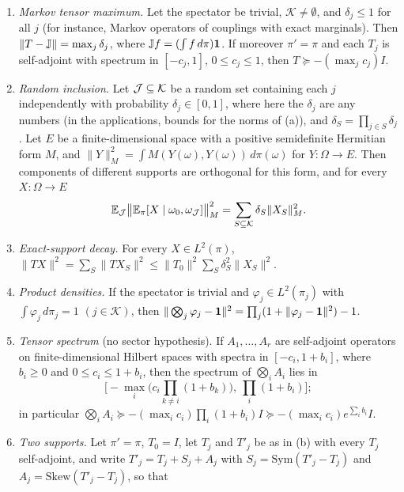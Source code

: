 \begin{lemma}
\begin{enumerate}[label=(\alph*)]
 $\delta_i,\delta'_i\le1$. Hence, in that case,
 \[
  \|\mathrm{Sym}(T'-T)\|\le\max\Bigl(\max_j\|\mathrm{Sym}(T'^\circ_j-T^\circ_j)\|,\
  \max_{j\ne k}(\delta_j\delta_k+\delta'_j\delta'_k)\Bigr),
 \]
 the second maximum being $0$ if $|\mathcal K|=1$, and the same holds for
 $\mathrm{Skew}(T'-T)$ and for $T'-T$.
\item\emph{Markov tensor maximum.} Let the spectator be trivial,
 $\mathcal K\ne\emptyset$, and $\delta_j\le1$ for all $j$ (for instance, Markov
 operators of couplings with exact marginals). Then
 $\|T-\mathbb J\|=\max_j\delta_j$, where $\mathbb J f=(\int f\,d\pi)\mathbf 1$. If moreover
 $\pi'=\pi$ and each $T_j$ is self-adjoint with spectrum in $[-c_j,1]$,
 $0\le c_j\le1$, then $T\succeq-(\max_jc_j)I$.
\item\emph{Random inclusion.} Let $\mathcal J\subseteq\mathcal K$ be a random set
 containing each $j$ independently with probability $\delta_j\in[0,1]$, where
 here the $\delta_j$ are any numbers (in the applications, bounds for the norms
 of (a)), and $\delta_S=\prod_{j\in S}\delta_j$. Let $E$ be
 a finite-dimensional space with a positive semidefinite Hermitian form $M$,
 and $\|Y\|_M^2=\int M(Y(\omega),Y(\omega))\,d\pi(\omega)$ for $Y\colon\Omega\to E$.
 Then components of different supports are orthogonal for this form, and for
 every $X\colon\Omega\to E$
 \[
  \mathbb E_\mathcal J\big\|\mathbb E_\pi[X\mid\omega_0,\omega_\mathcal J]\big\|_M^2=\sum_{S\subseteq\mathcal K}\delta_S\|X_S\|_M^2 .
 \]
\item\emph{Exact-support decay.} For every $X\in L^2(\pi)$,
 $\|TX\|^2=\sum_S\|TX_S\|^2\le\|T_0\|^2\sum_S\delta_S^2\|X_S\|^2$.
\item\emph{Product densities.} If the spectator is trivial and
 $\varphi_j\in L^2(\pi_j)$ with $\int\varphi_j\,d\pi_j=1$ $(j\in\mathcal K)$, then
 $\|\bigotimes_j\varphi_j-\mathbf 1\|^2=\prod_j(1+\|\varphi_j-\mathbf 1\|^2)-1$.
\item\emph{Tensor spectrum} (no sector hypothesis). If $A_1,\dots,A_r$ are
 self-adjoint operators on finite-dimensional Hilbert spaces with spectra in
 $[-c_i,1+b_i]$, where $b_i\ge0$ and $0\le c_i\le1+b_i$, then the spectrum of
 $\bigotimes_iA_i$ lies in
 \[
  \Big[-\max_i\Big(c_i\prod_{k\ne i}(1+b_k)\Big),\ \prod_i(1+b_i)\Big];
 \]
 in particular
 $\bigotimes_iA_i\succeq-(\max_ic_i)\prod_i(1+b_i)I\succeq-(\max_ic_i)e^{\sum_ib_i}I$.
\item\emph{Two supports.} Let $\pi'=\pi$, $T_0=I$, let $T_j$ and $T'_j$ be as
 in \textup{(b)} with every $T_j$ self-adjoint, and write $T'_j=T_j+S_j+A_j$
 with $S_j=\mathrm{Sym}(T'_j-T_j)$ and $A_j=\mathrm{Skew}(T'_j-T_j)$, so that

\end{enumerate}
\end{lemma}
